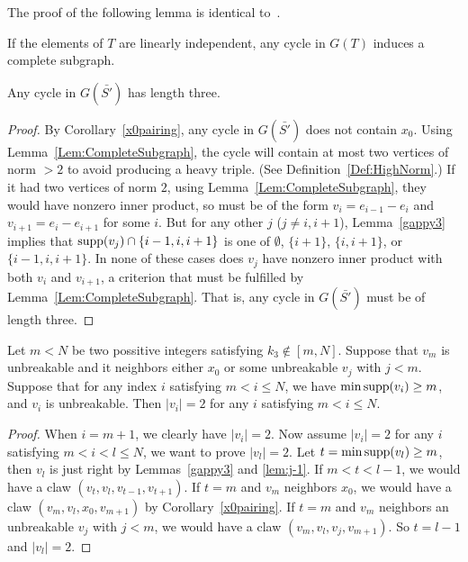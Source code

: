 The proof of the following lemma is identical to~\cite[Lemma~3.8]{greene:LSRP}.

\begin{lemma}\label{Lem:CompleteSubgraph}
If the elements of $T$ are linearly independent, any cycle in $G(T)$ induces a complete subgraph.
\end{lemma}

\begin{cor}\label{cycles}
Any cycle in $G(\bar{S'})$ has length three.
\end{cor}
\begin{proof}
By Corollary~\ref{x0pairing}, any cycle in $G(\bar{S'})$ does not contain $x_0$.
Using Lemma~\ref{Lem:CompleteSubgraph}, the cycle will contain at most two vertices of norm $>2$ to avoid producing a heavy triple. (See Definition~\ref{Def:HighNorm}.) If it had two vertices of norm $2$, using Lemma~\ref{Lem:CompleteSubgraph}, they would have nonzero inner product, so must be of the form $v_i = e_{i-1} - e_i$ and $v_{i+1} = e_i - e_{i+1}$ for some $i$. But for any other $j$ ($j\ne i, i+1$), Lemma~\ref{gappy3} implies that $\operatorname{supp}(v_j) \cap \{i-1,i,i+1\}$ is one of $\emptyset$, $\{i+1\}$, $\{i,i+1\}$, or $\{i-1,i,i+1\}$. In none of these cases does $v_j$ have nonzero inner product with both $v_i$ and $v_{i+1}$, a criterion that must be fulfilled by Lemma~\ref{Lem:CompleteSubgraph}. That is, any cycle in $G(\bar{S'})$ must be of length three. 
\end{proof}

\begin{lemma}\label{lem:AllNorm2}
Let $m<N$ be two possitive integers satisfying $k_3\notin[m,N]$. Suppose that $v_m$ is unbreakable and it neighbors either $x_0$ or some unbreakable $v_j$ with $j<m$. Suppose that for any index $i$ satisfying $m< i\le N$, we have $\min\operatorname{supp}(v_i)\ge m$, and $v_i$ is unbreakable. Then $|v_i|=2$ for any $i$ satisfying $m< i\le N$.
\end{lemma}
\begin{proof}
When $i=m+1$, we clearly have $|v_i|=2$. Now assume $|v_i|=2$ for any $i$ satisfying $m< i< l\le N$, we want to prove $|v_l|=2$. Let $t=\min\operatorname{supp}(v_l)\ge m$, then $v_l$ is just right by Lemmas~\ref{gappy3} and \ref{lem:j-1}. If $m<t<l-1$, we would have a claw $(v_t,v_l,v_{t-1},v_{t+1})$. If $t=m$ and $v_m$ neighbors $x_0$, we would have a claw $(v_m,v_l,x_0,v_{m+1})$ by Corollary~\ref{x0pairing}. If $t=m$ and $v_m$ neighbors an unbreakable $v_j$ with $j<m$, we would have a claw
$(v_m,v_l,v_{j},v_{m+1})$. So $t=l-1$ and $|v_l|=2$.
\end{proof}

